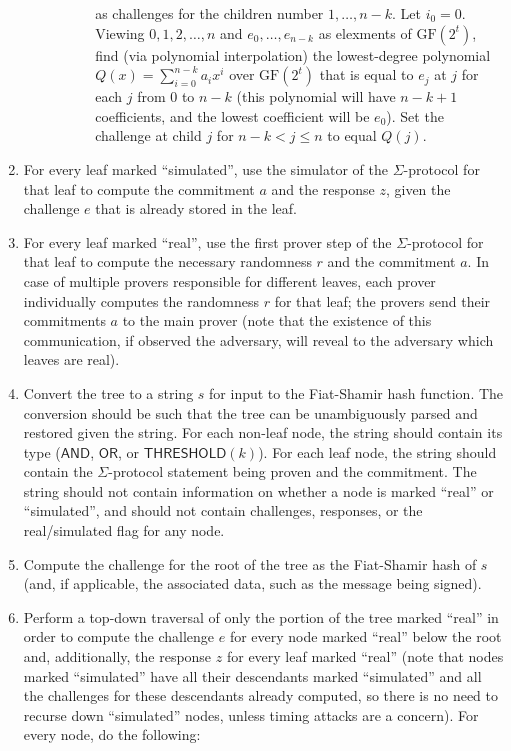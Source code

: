 \documentclass[11pt]{article}
\newcommand{\andnode}{\ensuremath{\mathsf{AND}}}
\newcommand{\ornode}{\ensuremath{\mathsf{OR}}}
\newcommand{\tnode}{\ensuremath{\mathsf{THRESHOLD}}}
\newcommand{\GF}{\ensuremath{\mathrm{GF}}}
\begin{document}
\begin{enumerate}
\begin{itemize}
\begin{itemize}
\begin{enumerate}
	         as challenges for the children number $1, \dots, n-k$.
	         Let $i_0 = 0$. Viewing $0, 1, 2, \dots, n$ and $e_0, \dots, e_{n-k}$ as elexments of $\GF(2^t)$, find (via polynomial interpolation) the
	          lowest-degree polynomial $Q(x)=\sum_{i=0}^{n-k} a_i x^i $ over $\GF(2^t)$ that is equal to $e_j$ at $j$ for each $j$ from
	          $0$ to $n-k$ (this polynomial will have $n-k+1$ coefficients, and the lowest coefficient will be $e_0$). Set the challenge at child
	          $j$ for $n-k<j\le n$ to equal $Q(j)$.
 	   \end{enumerate} 
        \end{itemize}
    \end{itemize}
    
    \item For every leaf marked ``simulated'', use the simulator of the $\Sigma$-protocol for that leaf to compute the commitment $a$ and the response $z$, given the challenge $e$ that is already stored in the leaf.
    
    \item \label{step:realcom} For every leaf marked ``real'', use the first prover step of the $\Sigma$-protocol for that leaf to compute the necessary randomness $r$ and the commitment $a$. In case of multiple provers responsible for different leaves, each prover individually computes the randomness $r$ for that leaf; the provers send their commitments $a$ to the main prover (note that the existence of this communication, if observed the adversary, will reveal to the adversary which leaves are real).
    
    \item \label{step:fs}  Convert the tree to a string $s$ for input to the Fiat-Shamir hash function. The conversion should be such that the tree can be unambiguously parsed and restored given the string. For each non-leaf node, the string should contain its type ($\andnode$, $\ornode$, or $\tnode(k)$). For each leaf node, the string should contain the $\Sigma$-protocol statement being proven and the commitment. The string should not contain information on whether a node is marked ``real'' or ``simulated'', and should not contain challenges, responses, or the real/simulated flag for any node.
    
    \item Compute the challenge for the root of the tree as the Fiat-Shamir hash of $s$ (and, if applicable,  the associated data, such as the message being signed). 
    
    \item \label{step:response} Perform a top-down traversal of only the portion of the tree marked ``real'' in order to compute the challenge $e$ for every node marked ``real'' below the root and, additionally, the response $z$ for every leaf marked ``real'' (note that nodes marked ``simulated'' have all their descendants marked ``simulated'' and all the challenges for these descendants already computed, so there is no need to recurse down ``simulated'' nodes, unless timing attacks are a concern). For every node, do the following:
    

\end{enumerate}
\end{document}
